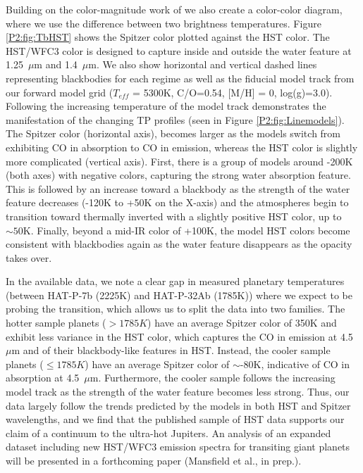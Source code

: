 Building on the color-magnitude work of \citet{Triaud2014b} we also create a color-color diagram, where we use the difference between two brightness temperatures. Figure \ref{P2:fig:TbHST} shows the Spitzer color plotted against the HST color. The HST/WFC3 color is designed to capture inside and outside the water feature at 1.25~$\mu$m and 1.4~$\mu$m. We also show horizontal and vertical dashed lines representing blackbodies for each regime as well as the fiducial model track from our forward model grid ($T_{eff}$ = 5300K, C/O=0.54, [M/H] = 0, log(g)=3.0). Following the increasing temperature of the model track demonstrates the manifestation of the changing TP profiles (seen in Figure \ref{P2:fig:Linemodels}). The Spitzer color (horizontal axis), becomes larger as the models switch from exhibiting CO in absorption to CO in emission, whereas the HST color is slightly more complicated (vertical axis). First, there is a group of models around -200K (both axes) with negative colors, capturing the strong water absorption feature. This is followed by an increase toward a blackbody as the strength of the water feature decreases (-120K to +50K on the X-axis) and the atmospheres begin to transition toward thermally inverted with a slightly positive HST color, up to $\sim50$K. Finally, beyond a mid-IR color of +100K, the model HST colors become consistent with blackbodies again as the water feature disappears as the  opacity takes over.

In the available data, we note a clear gap in measured planetary temperatures (between HAT-P-7b (2225K) and HAT-P-32Ab (1785K)) where we expect to be probing the transition, which allows us to split the data into two families. The hotter sample planets ($>1785K$) have an average Spitzer color of 350K and exhibit less variance in the HST color, which captures the CO in emission at 4.5~$\mu$m and of their blackbody-like features in HST. Instead, the cooler sample planets ($\leq1785K$) have an average Spitzer color of $\sim$-80K, indicative of CO in absorption at 4.5~$\mu$m. Furthermore, the cooler sample follows the increasing model track as the strength of the water feature becomes less strong. Thus, our data   largely follow  the trends predicted by the models in both HST and Spitzer wavelengths, and we find that the published sample of HST data supports our claim of a continuum to the ultra-hot Jupiters. An analysis of an expanded dataset including new HST/WFC3 emission spectra for transiting giant planets will be presented in a forthcoming paper (Mansfield et al., in prep.).

